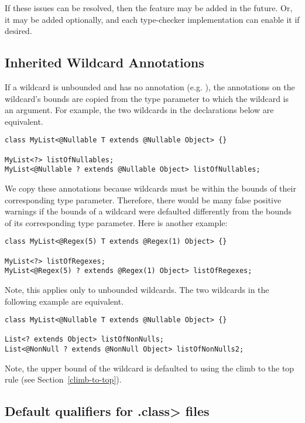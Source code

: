 If these issues can be resolved, then the feature may be added in the
future.  Or, it may be added optionally, and each type-checker
implementation can enable it if desired.


\subsection{Inherited Wildcard Annotations\label{inherited-wildcard-annotations}}

If a wildcard is unbounded and has no annotation (e.g. ),
the annotations on the wildcard's bounds are copied from the type parameter
to which the wildcard is an argument.  For example, the two wildcards in
the declarations below are equivalent.

\begin{Verbatim}
class MyList<@Nullable T extends @Nullable Object> {}

MyList<?> listOfNullables;
MyList<@Nullable ? extends @Nullable Object> listOfNullables;
\end{Verbatim}

We copy these annotations because wildcards must be within the bounds of their
corresponding type parameter.  Therefore, there would be many false positive
 warnings if the bounds of a wildcard
were defaulted differently from the bounds of its corresponding type parameter.
Here is another example:

\begin{Verbatim}
class MyList<@Regex(5) T extends @Regex(1) Object> {}

MyList<?> listOfRegexes;
MyList<@Regex(5) ? extends @Regex(1) Object> listOfRegexes;
\end{Verbatim}

Note, this applies only to unbounded wildcards.  The two wildcards in the
following example are equivalent.

\begin{Verbatim}
class MyList<@Nullable T extends @Nullable Object> {}

List<? extends Object> listOfNonNulls;
List<@NonNull ? extends @NonNull Object> listOfNonNulls2;
\end{Verbatim}

Note, the upper bound of the wildcard  is defaulted to
 using the climb to the top rule (see Section~\ref{climb-to-top}).

\subsection{Default qualifiers for \<.class>
files\label{defaults-classfile}}

